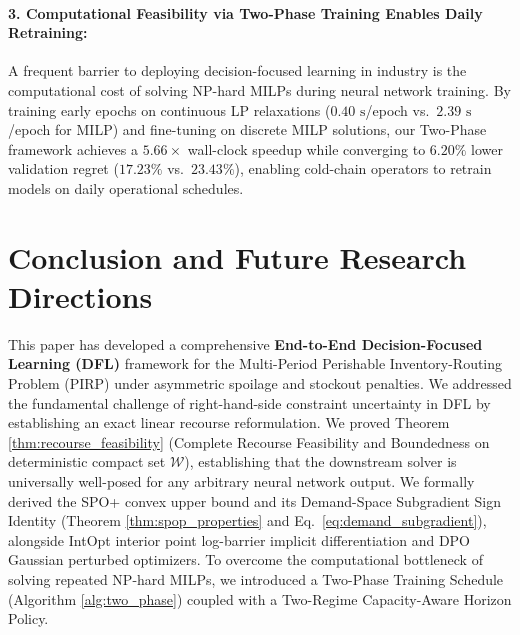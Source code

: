 \documentclass[11pt,a4paper]{article}
\theoremstyle{definition}
\theoremstyle{remark}
\begin{document}
\paragraph{3. Computational Feasibility via Two-Phase Training Enables Daily Retraining:}
A frequent barrier to deploying decision-focused learning in industry is the computational cost of solving NP-hard MILPs during neural network training. By training early epochs on continuous LP relaxations ($0.40\text{ s}$/epoch vs.\ $2.39\text{ s}$/epoch for MILP) and fine-tuning on discrete MILP solutions, our Two-Phase framework achieves a $5.66\times$ wall-clock speedup while converging to $6.20\%$ lower validation regret ($17.23\%$ vs.\ $23.43\%$), enabling cold-chain operators to retrain models on daily operational schedules.

\section{Conclusion and Future Research Directions}
\label{sec:conclusion}

This paper has developed a comprehensive \textbf{End-to-End Decision-Focused Learning (DFL)} framework for the Multi-Period Perishable Inventory-Routing Problem (PIRP) under asymmetric spoilage and stockout penalties. We addressed the fundamental challenge of right-hand-side constraint uncertainty in DFL by establishing an exact linear recourse reformulation. We proved Theorem \ref{thm:recourse_feasibility} (Complete Recourse Feasibility and Boundedness on deterministic compact set $\mathcal{W}$), establishing that the downstream solver is universally well-posed for any arbitrary neural network output. We formally derived the SPO+ convex upper bound and its Demand-Space Subgradient Sign Identity (Theorem \ref{thm:spop_properties} and Eq.\ \eqref{eq:demand_subgradient}), alongside IntOpt interior point log-barrier implicit differentiation and DPO Gaussian perturbed optimizers. To overcome the computational bottleneck of solving repeated NP-hard MILPs, we introduced a Two-Phase Training Schedule (Algorithm \ref{alg:two_phase}) coupled with a Two-Regime Capacity-Aware Horizon Policy. 
\end{document}
